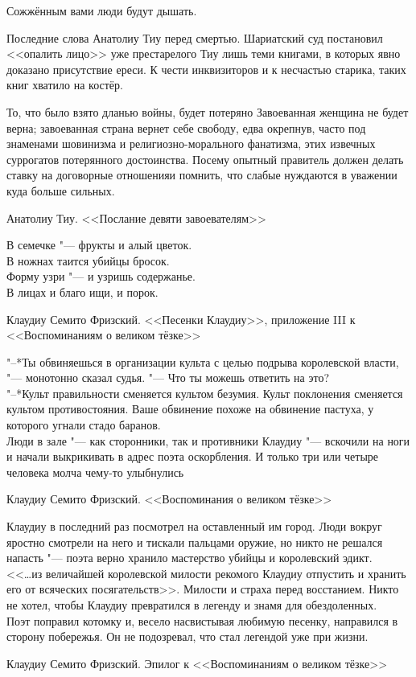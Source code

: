 \epigraph
{Сожжённым вами люди будут дышать.}
{Последние слова Анатолиу Тиу перед смертью.
Шариатский суд постановил <<опалить лицо>> уже престарелого Тиу лишь теми книгами, в которых явно доказано присутствие ереси.
К чести инквизиторов и к несчастью старика, таких книг хватило на костёр.}

\epigraph
{То, что было взято дланью войны\footnotemark, будет потеряно\ldotst
Завоеванная женщина не будет верна;
завоеванная страна вернет себе свободу, едва окрепнув, часто под знаменами шовинизма и религиозно-морального фанатизма, этих извечных суррогатов потерянного достоинства.
Посему опытный правитель должен делать ставку на договорные отношения\ldotst и помнить, что слабые нуждаются в уважении куда больше сильных.}
{Анатолиу Тиу.
<<Послание девяти завоевателям>>}

\epigraph
{В семечке "--- фрукты и алый цветок.\\
В ножнах таится убийцы бросок.\\
Форму узри "--- и узришь содержанье.\\
В лицах и благо ищи, и порок.}
{Клаудиу Семито Фризский.
<<Песенки Клаудиу>>, приложение III к <<Воспоминаниям о великом тёзке>>}

\epigraph
{"--*Ты обвиняешься в организации культа с целью подрыва королевской власти, "--- монотонно сказал судья.
"--- Что ты можешь ответить на это?\\
"--*Культ правильности сменяется культом безумия.
Культ поклонения сменяется культом противостояния.
Ваше обвинение похоже на обвинение пастуха, у которого угнали стадо баранов.\\
Люди в зале "--- как сторонники, так и противники Клаудиу "--- вскочили на ноги и начали выкрикивать в адрес поэта оскорбления.
И только три или четыре человека молча чему-то улыбнулись\ldotst}
{Клаудиу Семито Фризский.
<<Воспоминания о великом тёзке>>}

\epigraph
{Клаудиу в последний раз посмотрел на оставленный им город.
Люди вокруг яростно смотрели на него и тискали пальцами оружие, но никто не решался напасть "--- поэта верно хранило мастерство убийцы и королевский эдикт.\\
<<\ldots из величайшей королевской милости рекомого Клаудиу отпустить и хранить его от всяческих посягательств>>.
Милости и страха перед восстанием.
Никто не хотел, чтобы Клаудиу превратился в легенду и знамя для обездоленных.\\
Поэт поправил котомку и, весело насвистывая любимую песенку, направился в сторону побережья.
Он не подозревал, что стал легендой уже при жизни.}
{Клаудиу Семито Фризский. Эпилог к <<Воспоминаниям о великом тёзке>>}

